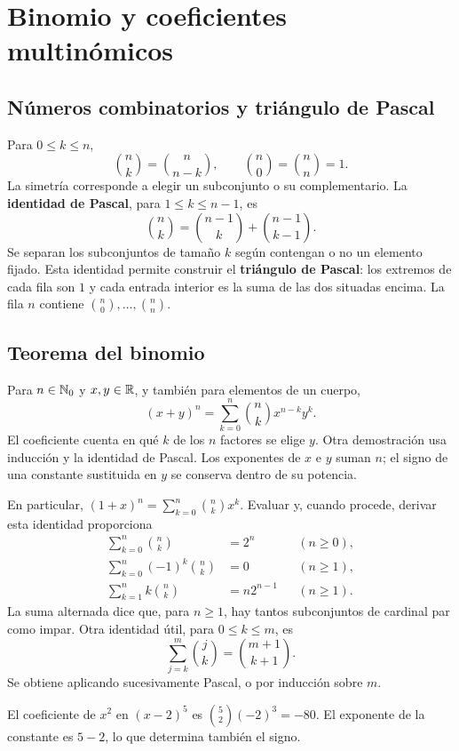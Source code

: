 \chapter{Binomio y coeficientes multinómicos}
\label{md:binomio}

\section{Números combinatorios y triángulo de Pascal}

Para $0\le k\le n$,
\[
 \binom nk=\binom n{n-k},\qquad
 \binom n0=\binom nn=1.
\]
La simetría corresponde a elegir un subconjunto o su complementario.
La \textbf{identidad de Pascal}, para $1\le k\le n-1$, es
\[
 \binom nk=\binom{n-1}{k}+\binom{n-1}{k-1}.
\]
Se separan los subconjuntos de tamaño $k$ según contengan o no un
elemento fijado. Esta identidad permite construir el
\textbf{triángulo de Pascal}: los extremos de cada fila son $1$ y
cada entrada interior es la suma de las dos situadas encima.
La fila $n$ contiene $\binom n0,\ldots,\binom nn$.

\section{Teorema del binomio}

Para $n\in\mathbb{N}_0$ y $x,y\in\mathbb{R}$, y también para elementos de un cuerpo,
\[
 \boxed{(x+y)^n=\sum_{k=0}^n\binom nk x^{n-k}y^k.}
\]
El coeficiente cuenta en qué $k$ de los $n$ factores se elige $y$.
Otra demostración usa inducción y la identidad de Pascal.
Los exponentes de $x$ e $y$ suman $n$; el signo de una constante
sustituida en $y$ se conserva dentro de su potencia.

En particular, $(1+x)^n=\sum_{k=0}^n\binom nk x^k$.
Evaluar y, cuando procede, derivar esta identidad proporciona
\[
 \begin{aligned}
 \sum_{k=0}^n\binom nk&=2^n &&(n\ge0),\\
 \sum_{k=0}^n(-1)^k\binom nk&=0 &&(n\ge1),\\
 \sum_{k=1}^n k\binom nk&=n2^{n-1} &&(n\ge1).
 \end{aligned}
\]
La suma alternada dice que, para $n\ge1$, hay tantos subconjuntos
de cardinal par como impar.
Otra identidad útil, para $0\le k\le m$, es
\[
 \sum_{j=k}^m\binom jk=\binom{m+1}{k+1}.
\]
Se obtiene aplicando sucesivamente Pascal, o por inducción sobre $m$.

\begin{ejemplo}
El coeficiente de $x^2$ en $(x-2)^5$ es
$\binom52(-2)^3=-80$. El exponente de la constante es $5-2$,
lo que determina también el signo.
\end{ejemplo}

